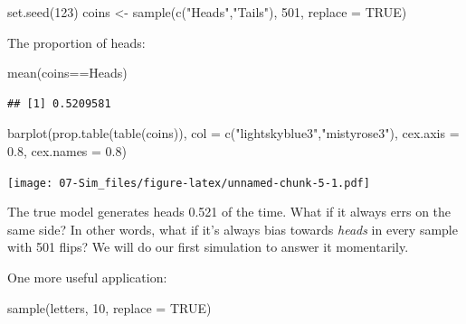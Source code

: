 \documentclass[
]{book}
\newenvironment{Shaded}{\begin{snugshade}}{\end{snugshade}}
\newcommand{\AttributeTok}[1]{\textcolor[rgb]{0.77,0.63,0.00}{#1}}
\newcommand{\ConstantTok}[1]{\textcolor[rgb]{0.00,0.00,0.00}{#1}}
\newcommand{\DecValTok}[1]{\textcolor[rgb]{0.00,0.00,0.81}{#1}}
\newcommand{\FloatTok}[1]{\textcolor[rgb]{0.00,0.00,0.81}{#1}}
\newcommand{\FunctionTok}[1]{\textcolor[rgb]{0.00,0.00,0.00}{#1}}
\newcommand{\NormalTok}[1]{#1}
\newcommand{\OtherTok}[1]{\textcolor[rgb]{0.56,0.35,0.01}{#1}}
\newcommand{\SpecialCharTok}[1]{\textcolor[rgb]{0.00,0.00,0.00}{#1}}
\newcommand{\StringTok}[1]{\textcolor[rgb]{0.31,0.60,0.02}{#1}}
\begin{document}
\begin{Shaded}
\begin{Highlighting}[]
\FunctionTok{set.seed}\NormalTok{(}\DecValTok{123}\NormalTok{)}
\NormalTok{coins }\OtherTok{\textless{}{-}} \FunctionTok{sample}\NormalTok{(}\FunctionTok{c}\NormalTok{(}\StringTok{"Heads"}\NormalTok{,}\StringTok{"Tails"}\NormalTok{), }\DecValTok{501}\NormalTok{, }\AttributeTok{replace =} \ConstantTok{TRUE}\NormalTok{)}
\end{Highlighting}
\end{Shaded}

The proportion of heads:

\begin{Shaded}
\begin{Highlighting}[]
\FunctionTok{mean}\NormalTok{(coins}\SpecialCharTok{==}\StringTok{\textquotesingle{}Heads\textquotesingle{}}\NormalTok{)}
\end{Highlighting}
\end{Shaded}

\begin{verbatim}
## [1] 0.5209581
\end{verbatim}

\begin{Shaded}
\begin{Highlighting}[]
\FunctionTok{barplot}\NormalTok{(}\FunctionTok{prop.table}\NormalTok{(}\FunctionTok{table}\NormalTok{(coins)), }
        \AttributeTok{col =} \FunctionTok{c}\NormalTok{(}\StringTok{"lightskyblue3"}\NormalTok{,}\StringTok{"mistyrose3"}\NormalTok{),}
        \AttributeTok{cex.axis =} \FloatTok{0.8}\NormalTok{, }\AttributeTok{cex.names =} \FloatTok{0.8}\NormalTok{)}
\end{Highlighting}
\end{Shaded}

\texttt{[image: 07-Sim\_files/figure-latex/unnamed-chunk-5-1.pdf]}

The true model generates heads 0.521 of the time. What if it always errs on the same side? In other words, what if it's always bias towards \emph{heads} in every sample with 501 flips? We will do our first simulation to answer it momentarily.

One more useful application:

\begin{Shaded}
\begin{Highlighting}[]
\FunctionTok{sample}\NormalTok{(letters, }\DecValTok{10}\NormalTok{, }\AttributeTok{replace =} \ConstantTok{TRUE}\NormalTok{)}
\end{Highlighting}
\end{Shaded}
\end{document}
